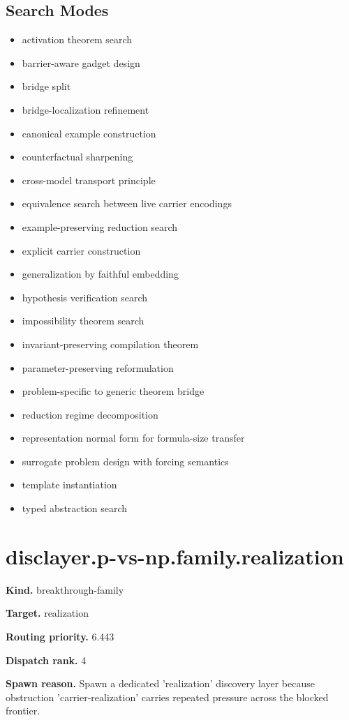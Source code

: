 \documentclass[11pt]{article}
\begin{document}
\subsection*{Search Modes}
\begin{itemize}[leftmargin=*,itemsep=0.2em]
\item activation theorem search
\item barrier-aware gadget design
\item bridge split
\item bridge-localization refinement
\item canonical example construction
\item counterfactual sharpening
\item cross-model transport principle
\item equivalence search between live carrier encodings
\item example-preserving reduction search
\item explicit carrier construction
\item generalization by faithful embedding
\item hypothesis verification search
\item impossibility theorem search
\item invariant-preserving compilation theorem
\item parameter-preserving reformulation
\item problem-specific to generic theorem bridge
\item reduction regime decomposition
\item representation normal form for formula-size transfer
\item surrogate problem design with forcing semantics
\item template instantiation
\item typed abstraction search
\end{itemize}
\section{disclayer.p-vs-np.family.realization}
\textbf{Kind.} breakthrough-family

\textbf{Target.} realization

\textbf{Routing priority.} 6.443

\textbf{Dispatch rank.} 4

\textbf{Spawn reason.} Spawn a dedicated 'realization' discovery layer because obstruction 'carrier-realization' carries repeated pressure across the blocked frontier.
\end{document}
